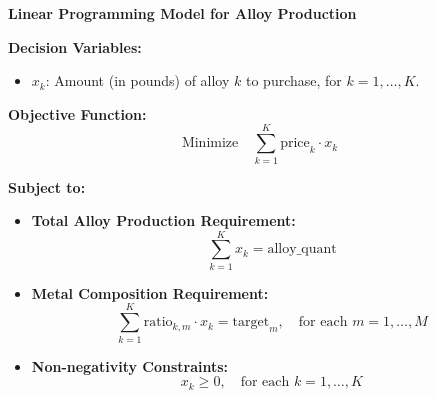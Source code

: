 \documentclass{article}
\begin{document}
\textbf{Linear Programming Model for Alloy Production}

\textbf{Decision Variables:}
\begin{itemize}
    \item $x_k$: Amount (in pounds) of alloy $k$ to purchase, for $k = 1, \ldots, K$.
\end{itemize}

\textbf{Objective Function:}
\[
\text{Minimize} \quad \sum_{k=1}^{K} \text{price}_k \cdot x_k 
\]

\textbf{Subject to:}
\begin{itemize}
    \item \textbf{Total Alloy Production Requirement:}
    \[
    \sum_{k=1}^{K} x_k = \text{alloy\_quant} 
    \]
    
    \item \textbf{Metal Composition Requirement:}
    \[
    \sum_{k=1}^{K} \text{ratio}_{k,m} \cdot x_k = \text{target}_m, \quad \text{for each } m = 1, \ldots, M
    \]
    
    \item \textbf{Non-negativity Constraints:}
    \[
    x_k \geq 0, \quad \text{for each } k = 1, \ldots, K
    \]
\end{itemize}
\end{document}
